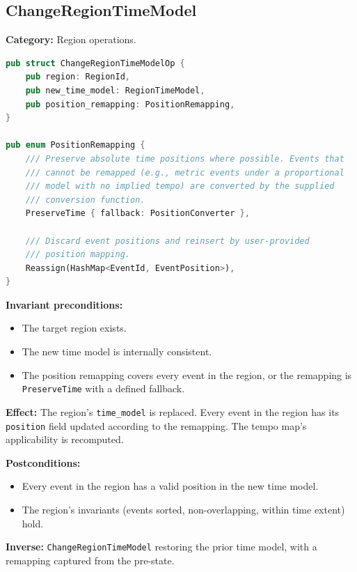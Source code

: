 \documentclass[11pt,letterpaper]{report}
\begin{document}
\subsection{ChangeRegionTimeModel}

\textbf{Category:} Region operations.

\begin{lstlisting}[language=Rust]
pub struct ChangeRegionTimeModelOp {
    pub region: RegionId,
    pub new_time_model: RegionTimeModel,
    pub position_remapping: PositionRemapping,
}

pub enum PositionRemapping {
    /// Preserve absolute time positions where possible. Events that
    /// cannot be remapped (e.g., metric events under a proportional
    /// model with no implied tempo) are converted by the supplied
    /// conversion function.
    PreserveTime { fallback: PositionConverter },

    /// Discard event positions and reinsert by user-provided
    /// position mapping.
    Reassign(HashMap<EventId, EventPosition>),
}
\end{lstlisting}

\textbf{Invariant preconditions:}
\begin{itemize}
  \item The target region exists.
  \item The new time model is internally consistent.
  \item The position remapping covers every event in the region, or
    the remapping is \texttt{PreserveTime} with a defined fallback.
\end{itemize}

\textbf{Effect:} The region's \texttt{time\_model} is replaced. Every
event in the region has its \texttt{position} field updated according
to the remapping. The tempo map's applicability is recomputed.

\textbf{Postconditions:}
\begin{itemize}
  \item Every event in the region has a valid position in the new
    time model.
  \item The region's invariants (events sorted, non-overlapping,
    within time extent) hold.
\end{itemize}

\textbf{Inverse:} \texttt{ChangeRegionTimeModel} restoring the prior
time model, with a remapping captured from the pre-state.
\end{document}
